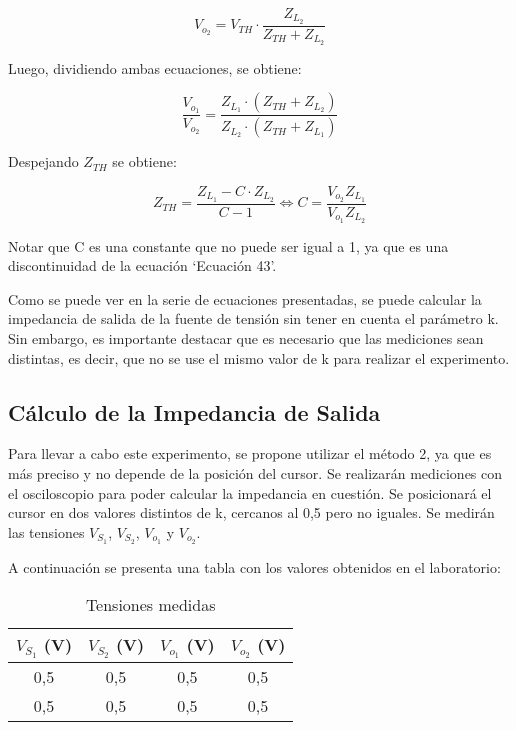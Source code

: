 \documentclass[12pt,oneside,a4paper]{article}
\begin{document}
\begin{equation}
    V_{o_2} = V_{TH} \cdot \frac{Z_{L_2}}{Z_{TH} + Z_{L_2}}
\end{equation}

Luego, dividiendo ambas ecuaciones, se obtiene: 

\begin{equation}
    \frac{V_{o_1}}{V_{o_2}} = \frac{Z_{L_1}\cdot (Z_{TH} + Z_{L_2})}{Z_{L_2}\cdot (Z_{TH} + Z_{L_1})}
\end{equation}

Despejando $Z_{TH}$ se obtiene:

\begin{equation}
    Z_{TH} = \frac{Z_{L_1} - C\cdot Z_{L_2}}{C - 1} \iff C = \frac{V_{o_2} Z_{L_1}}{V_{o_1} Z_{L_2}}
\end{equation}

Notar que C es una constante que no puede ser igual a 1, ya que es una discontinuidad de la 
ecuación \enquote*{Ecuación 43}.

Como se puede ver en la serie de ecuaciones presentadas, se puede calcular la impedancia de salida 
de la fuente de tensión sin tener en cuenta el parámetro k. Sin embargo, es importante destacar que 
es necesario que las mediciones sean distintas, es decir, que no se use el mismo valor de k para 
realizar el experimento.

\subsection{Cálculo de la Impedancia de Salida}

Para llevar a cabo este experimento, se propone utilizar el método 2, ya que es más preciso y 
no depende de la posición del cursor. Se realizarán mediciones con el osciloscopio para poder
calcular la impedancia en cuestión. Se posicionará el cursor en dos valores distintos de k, cercanos 
al 0,5 pero no iguales. Se medirán las tensiones $V_{S_1}$, $V_{S_2}$, $V_{o_1}$ y $V_{o_2}$.

A continuación se presenta una tabla con los valores obtenidos en el laboratorio:

\begin{table}[H]
    \centering
    \begin{tabular}{|c|c|c|c|}
        \hline
        \rowcolor[HTML]{C0C0C0} 
        \hline
        \textbf{$V_{S_1}$ (V)} & \textbf{$V_{S_2}$ (V)} & \textbf{$V_{o_1}$ (V)} & \textbf{$V_{o_2}$ (V)} \\ \hline
        0,5                   & 0,5           & 0,5           & 0,5           \\ \hline
        0,5                   & 0,5           & 0,5           & 0,5           \\ \hline
    \end{tabular}
    \caption{Tensiones medidas}
\end{table}
\end{document}
